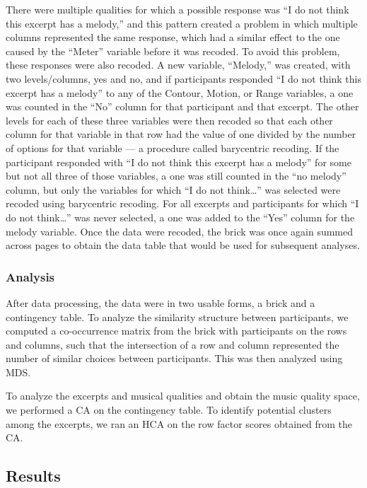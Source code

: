 \documentclass[
  english,
  man,floatsintext]{apa6}
\begin{document}
There were multiple qualities for which a possible response was ``I do not think this excerpt has a melody,'' and this pattern created a problem in which multiple columns represented the same response, which had a similar effect to the one caused by the ``Meter'' variable before it was recoded. To avoid this problem, these responses were also recoded. A new variable, ``Melody,'' was created, with two levels/columns, yes and no, and if participants responded ``I do not think this excerpt has a melody'' to any of the Contour, Motion, or Range variables, a one was counted in the ``No'' column for that participant and that excerpt. The other levels for each of these three variables were then recoded so that each other column for that variable in that row had the value of one divided by the number of options for that variable --- a procedure called barycentric recoding. If the participant responded with ``I do not think this excerpt has a melody'' for some but not all three of those variables, a one was still counted in the ``no melody'' column, but only the variables for which ``I do not think\ldots{}'' was selected were recoded using barycentric recoding. For all excerpts and participants for which ``I do not think\ldots{}'' was never selected, a one was added to the ``Yes'' column for the melody variable. Once the data were recoded, the brick was once again summed across pages to obtain the data table that would be used for subsequent analyses.

\hypertarget{analysis}{%
\subsubsection{Analysis}\label{analysis}}

After data processing, the data were in two usable forms, a brick and a contingency table. To analyze the similarity structure between participants, we computed a co-occurrence matrix from the brick with participants on the rows and columns, such that the intersection of a row and column represented the number of similar choices between participants. This was then analyzed using MDS.

To analyze the excerpts and musical qualities and obtain the music quality space, we performed a CA on the contingency table. To identify potential clusters among the excerpts, we ran an HCA on the row factor scores obtained from the CA.

\hypertarget{results}{%
\subsection{Results}\label{results}}
\end{document}
